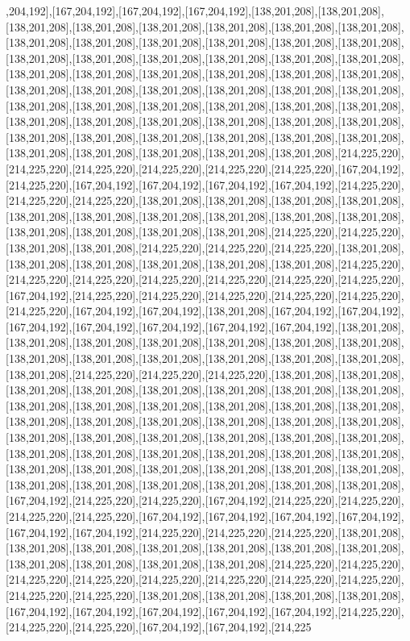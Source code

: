 ,204,192],[167,204,192],[167,204,192],[167,204,192],[138,201,208],[138,201,208],[138,201,208],[138,201,208],[138,201,208],[138,201,208],[138,201,208],[138,201,208],[138,201,208],[138,201,208],[138,201,208],[138,201,208],[138,201,208],[138,201,208],[138,201,208],[138,201,208],[138,201,208],[138,201,208],[138,201,208],[138,201,208],[138,201,208],[138,201,208],[138,201,208],[138,201,208],[138,201,208],[138,201,208],[138,201,208],[138,201,208],[138,201,208],[138,201,208],[138,201,208],[138,201,208],[138,201,208],[138,201,208],[138,201,208],[138,201,208],[138,201,208],[138,201,208],[138,201,208],[138,201,208],[138,201,208],[138,201,208],[138,201,208],[138,201,208],[138,201,208],[138,201,208],[138,201,208],[138,201,208],[138,201,208],[138,201,208],[138,201,208],[138,201,208],[138,201,208],[138,201,208],[138,201,208],[214,225,220],[214,225,220],[214,225,220],[214,225,220],[214,225,220],[214,225,220],[167,204,192],[214,225,220],[167,204,192],[167,204,192],[167,204,192],[167,204,192],[214,225,220],[214,225,220],[214,225,220],[138,201,208],[138,201,208],[138,201,208],[138,201,208],[138,201,208],[138,201,208],[138,201,208],[138,201,208],[138,201,208],[138,201,208],[138,201,208],[138,201,208],[138,201,208],[138,201,208],[214,225,220],[214,225,220],[138,201,208],[138,201,208],[214,225,220],[214,225,220],[214,225,220],[138,201,208],[138,201,208],[138,201,208],[138,201,208],[138,201,208],[138,201,208],[214,225,220],[214,225,220],[214,225,220],[214,225,220],[214,225,220],[214,225,220],[214,225,220],[167,204,192],[214,225,220],[214,225,220],[214,225,220],[214,225,220],[214,225,220],[214,225,220],[167,204,192],[167,204,192],[138,201,208],[167,204,192],[167,204,192],[167,204,192],[167,204,192],[167,204,192],[167,204,192],[167,204,192],[138,201,208],[138,201,208],[138,201,208],[138,201,208],[138,201,208],[138,201,208],[138,201,208],[138,201,208],[138,201,208],[138,201,208],[138,201,208],[138,201,208],[138,201,208],[138,201,208],[214,225,220],[214,225,220],[214,225,220],[138,201,208],[138,201,208],[138,201,208],[138,201,208],[138,201,208],[138,201,208],[138,201,208],[138,201,208],[138,201,208],[138,201,208],[138,201,208],[138,201,208],[138,201,208],[138,201,208],[138,201,208],[138,201,208],[138,201,208],[138,201,208],[138,201,208],[138,201,208],[138,201,208],[138,201,208],[138,201,208],[138,201,208],[138,201,208],[138,201,208],[138,201,208],[138,201,208],[138,201,208],[138,201,208],[138,201,208],[138,201,208],[138,201,208],[138,201,208],[138,201,208],[138,201,208],[138,201,208],[138,201,208],[138,201,208],[138,201,208],[138,201,208],[138,201,208],[138,201,208],[138,201,208],[167,204,192],[214,225,220],[214,225,220],[167,204,192],[214,225,220],[214,225,220],[214,225,220],[214,225,220],[167,204,192],[167,204,192],[167,204,192],[167,204,192],[167,204,192],[167,204,192],[214,225,220],[214,225,220],[214,225,220],[138,201,208],[138,201,208],[138,201,208],[138,201,208],[138,201,208],[138,201,208],[138,201,208],[138,201,208],[138,201,208],[138,201,208],[138,201,208],[214,225,220],[214,225,220],[214,225,220],[214,225,220],[214,225,220],[214,225,220],[214,225,220],[214,225,220],[214,225,220],[214,225,220],[138,201,208],[138,201,208],[138,201,208],[138,201,208],[167,204,192],[167,204,192],[167,204,192],[167,204,192],[167,204,192],[214,225,220],[214,225,220],[214,225,220],[167,204,192],[167,204,192],[214,225